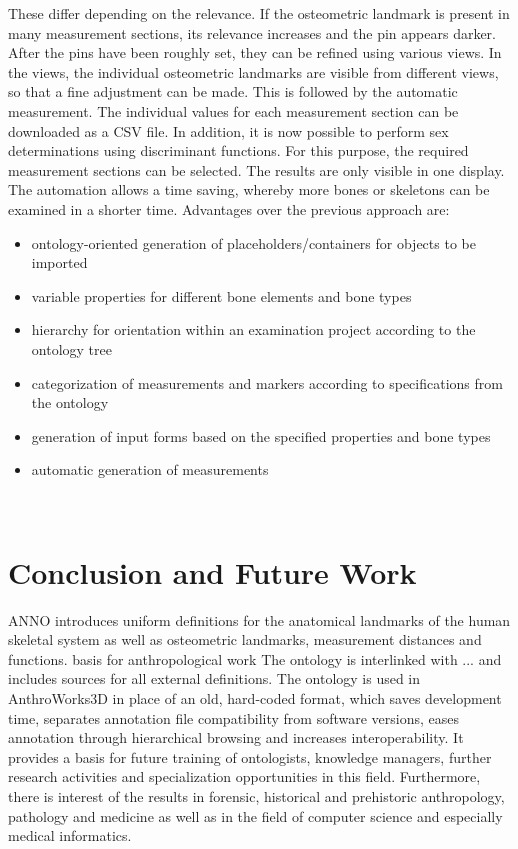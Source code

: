 \documentclass[sw]{iosart2x}
\newcommand{\aw}{AnthroWorks3D}
\begin{document}
These differ depending on the relevance.
If the osteometric landmark is present in many measurement sections, its relevance increases and the pin appears darker.
After the pins have been roughly set, they can be refined using various views.
In the views, the individual osteometric landmarks are visible from different views, so that a fine adjustment can be made.
This is followed by the automatic measurement.
The individual values for each measurement section can be downloaded as a CSV file.
In addition, it is now possible to perform sex determinations using discriminant functions.
For this purpose, the required measurement sections can be selected.
The results are only visible in one display.
The automation allows a time saving, whereby more bones or skeletons can be examined in a shorter time.
Advantages over the previous approach are:

\begin{itemize}
\item ontology-oriented generation of placeholders/containers for objects to be imported
\item variable properties for different bone elements and bone types
\item hierarchy for orientation within an examination project according to the ontology tree
\item categorization of measurements and markers according to specifications from the ontology
\item generation of input forms based on the specified properties and bone types
\item automatic generation of measurements
\end{itemize}

~\citep{rickview}
\section{Conclusion and Future Work}

ANNO introduces uniform definitions for the anatomical landmarks of the human skeletal system as well as osteometric landmarks, measurement distances and functions.
basis for anthropological work
The ontology is interlinked with ... and includes sources for all external definitions.
The ontology is used in \aw{} in place of an old, hard-coded format, which saves development time, separates annotation file compatibility from software versions, eases annotation through hierarchical browsing and increases interoperability.
It provides a basis for future training of ontologists, knowledge managers, further research activities and specialization opportunities in this field.
Furthermore, there is interest of the results in forensic, historical and prehistoric anthropology, pathology and medicine as well as in the field of computer science and especially medical informatics.
\end{document}
